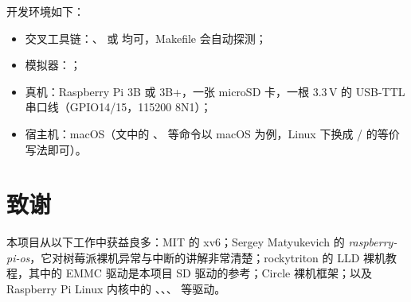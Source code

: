 开发环境如下：

\begin{itemize}
  \item 交叉工具链：、 或  均可，Makefile 会自动探测；
  \item 模拟器：；
  \item 真机：Raspberry Pi 3B 或 3B+，一张 microSD 卡，一根 3.3\,V 的 USB-TTL 串口线（GPIO14/15，115200 8N1）；
  \item 宿主机：macOS（文中的 、 等命令以 macOS 为例，Linux 下换成 / 的等价写法即可）。
\end{itemize}

\section{致谢}

本项目从以下工作中获益良多：MIT 的 xv6\cite{xv6book}；Sergey Matyukevich 的 \emph{raspberry-pi-os}\cite{rpios}，它对树莓派裸机异常与中断的讲解非常清楚；rockytriton 的 LLD 裸机教程\cite{lld}，其中的 EMMC 驱动是本项目 SD 驱动的参考；Circle 裸机框架\cite{circle}；以及 Raspberry Pi Linux 内核中的 、、、 等驱动\cite{rpilinux}。
